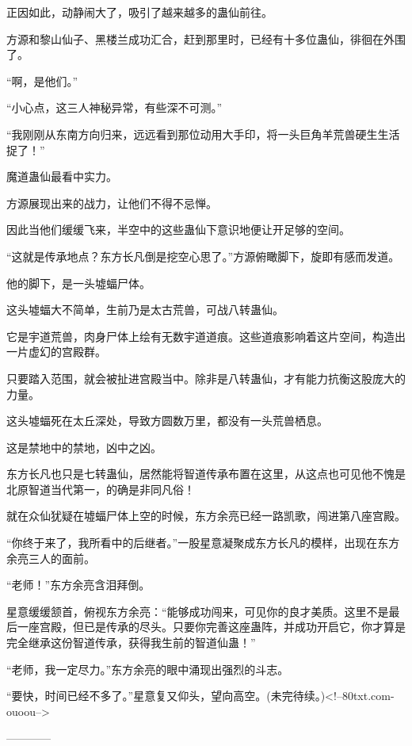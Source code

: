 \begin{this_body}
正因如此，动静闹大了，吸引了越来越多的蛊仙前往。

方源和黎山仙子、黑楼兰成功汇合，赶到那里时，已经有十多位蛊仙，徘徊在外围了。

“啊，是他们。”

“小心点，这三人神秘异常，有些深不可测。”

“我刚刚从东南方向归来，远远看到那位动用大手印，将一头巨角羊荒兽硬生生活捉了！”

魔道蛊仙最看中实力。

方源展现出来的战力，让他们不得不忌惮。

因此当他们缓缓飞来，半空中的这些蛊仙下意识地便让开足够的空间。

“这就是传承地点？东方长凡倒是挖空心思了。”方源俯瞰脚下，旋即有感而发道。

他的脚下，是一头墟蝠尸体。

这头墟蝠大不简单，生前乃是太古荒兽，可战八转蛊仙。

它是宇道荒兽，肉身尸体上绘有无数宇道道痕。这些道痕影响着这片空间，构造出一片虚幻的宫殿群。

只要踏入范围，就会被扯进宫殿当中。除非是八转蛊仙，才有能力抗衡这股庞大的力量。

这头墟蝠死在太丘深处，导致方圆数万里，都没有一头荒兽栖息。

这是禁地中的禁地，凶中之凶。

东方长凡也只是七转蛊仙，居然能将智道传承布置在这里，从这点也可见他不愧是北原智道当代第一，的确是非同凡俗！

就在众仙犹疑在墟蝠尸体上空的时候，东方余亮已经一路凯歌，闯进第八座宫殿。

“你终于来了，我所看中的后继者。”一股星意凝聚成东方长凡的模样，出现在东方余亮三人的面前。

“老师！”东方余亮含泪拜倒。

星意缓缓颔首，俯视东方余亮：“能够成功闯来，可见你的良才美质。这里不是最后一座宫殿，但已是传承的尽头。只要你完善这座蛊阵，并成功开启它，你才算是完全继承这份智道传承，获得我生前的智道仙蛊！”

“老师，我一定尽力。”东方余亮的眼中涌现出强烈的斗志。

“要快，时间已经不多了。”星意复又仰头，望向高空。(未完待续。)<!--80txt.com-ouoou-->

------------

\end{this_body}

